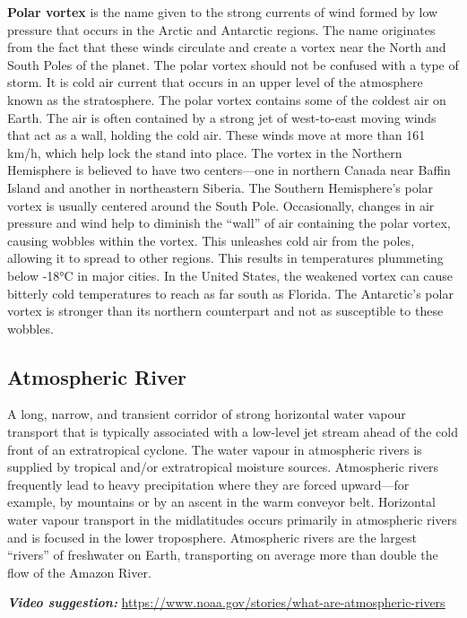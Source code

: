 \documentclass[12pt,oneside]{book}
\begin{document}
\textbf{Polar vortex} is the name given to the strong currents of wind
formed by low pressure that occurs in the Arctic and Antarctic regions.
The name originates from the fact that these winds circulate and create
a vortex near the North and South Poles of the planet. The polar vortex
should not be confused with a type of storm. It is cold air current that
occurs in an upper level of the atmosphere known as the stratosphere.
The polar vortex contains some of the coldest air on Earth. The air is
often contained by a strong jet of west-to-east moving winds that act as
a wall, holding the cold air. These winds move at more than 161 km/h,
which help lock the stand into place. The vortex in the Northern
Hemisphere is believed to have two centers---one in northern Canada near
Baffin Island and another in northeastern Siberia. The Southern
Hemisphere's polar vortex is usually centered around the South Pole.
Occasionally, changes in air pressure and wind help to diminish the
``wall'' of air containing the polar vortex, causing wobbles within the
vortex. This unleashes cold air from the poles, allowing it to spread to
other regions. This results in temperatures plummeting below -18°C in
major cities. In the United States, the weakened vortex can cause
bitterly cold temperatures to reach as far south as Florida. The
Antarctic's polar vortex is stronger than its northern counterpart and
not as susceptible to these wobbles.

\subsection{Atmospheric River}\label{atmospheric-river}

A long, narrow, and transient corridor of strong horizontal water vapour
transport that is typically associated with a low-level jet stream ahead
of the cold front of an extratropical cyclone. The water vapour in
atmospheric rivers is supplied by tropical and/or extratropical moisture
sources. Atmospheric rivers frequently lead to heavy precipitation where
they are forced upward---for example, by mountains or by an ascent in
the warm conveyor belt. Horizontal water vapour transport in the
midlatitudes occurs primarily in atmospheric rivers and is focused in
the lower troposphere. Atmospheric rivers are the largest ``rivers'' of
freshwater on Earth, transporting on average more than double the flow
of the Amazon River.

\textbf{\emph{Video suggestion:}}
\url{https://www.noaa.gov/stories/what-are-atmospheric-rivers}
\end{document}
